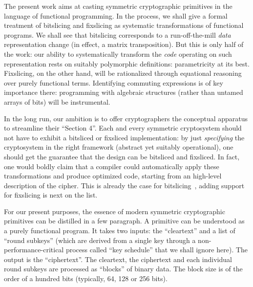 \documentclass[draft,english]{jflart}
\begin{document}
The present work aims at casting symmetric cryptographic primitives in
the language of functional programming. In the process, we shall give
a formal treatment of bitslicing and fixslicing as systematic
transformations of functional programs. We shall see that bitslicing
corresponds to a run-off-the-mill \emph{data} representation change
(in effect, a matrix transposition). But this is only half of the
work: our ability to systematically transform the \emph{code}
operating on such representation rests on suitably polymorphic
definitions: parametricity at its best. Fixslicing, on the other hand,
will be rationalized through equational reasoning over purely
functional terms. Identifying commuting expressions is of key
importance there: programming with algebraic structures (rather than
untamed arrays of bits) will be instrumental.

In the long run, our ambition is to offer cryptographers the
conceptual apparatus to streamline their ``Section 4''.
Each and every symmetric cryptosystem should not have to exhibit a
bitsliced or fixsliced implementation: by just \emph{specifying} the
cryptosystem in the right framework (abstract yet suitably
operational), one should get the guarantee that the design can be
bitsliced and fixsliced. In fact, one would boldly claim that a
compiler could automatically apply these transformations and produce
optimized code, starting from an high-level description of the cipher.
This is already the case for bitslicing~\citep{mercadier:PhD}, adding support
for fixslicing is next on the list.


For our present purposes, the essence of modern symmetric
cryptographic primitives can be distilled in a few paragraph. A
primitive can be understood as a purely functional program. It takes
two inputs: the ``cleartext'' and a list of ``round subkeys'' (which
are derived from a single key through a non-performance-critical
process called ``key schedule'' that we shall ignore here). The output
is the ``ciphertext''. The cleartext, the ciphertext and each
individual round subkeys are processed as ``blocks'' of binary data.
The block size is of the order of a hundred bits (typically, 64, 128
or 256 bits).
\end{document}
